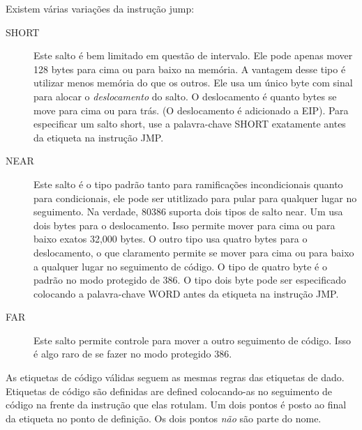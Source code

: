 Existem várias variações da instrução jump:
\begin{description}

\item[SHORT] Este salto é bem limitado em questão de intervalo. Ele pode apenas mover 128 bytes para cima
ou para baixo na memória. A vantagem desse tipo é utilizar menos
memória do que os outros. Ele usa um único byte com sinal para alocar o 
\emph{deslocamento} do salto. O deslocamento é quanto bytes se move para cima 
ou para trás. (O deslocamento é adicionado a EIP). Para especificar um salto
short, use a palavra-chave {\code SHORT} exatamente antes da etiqueta
na instrução {\code JMP}.

\item[NEAR] Este salto é o tipo padrão tanto para ramificações incondicionais quanto 
para condicionais, ele pode ser utitlizado para pular para qualquer lugar no
seguimento. Na verdade, 80386 suporta dois tipos de salto near. Um
usa dois bytes para o deslocamento. Isso permite mover para cima ou
para baixo exatos 32,000 bytes. O outro tipo usa quatro bytes para o
deslocamento, o que claramento permite se mover para cima ou para baixo a qualquer lugar no 
seguimento de código. O tipo de quatro byte é o padrão no modo protegido de 386. 
O tipo dois byte pode ser especificado colocando a palavra-chave {\code WORD}
antes da etiqueta na instrução {\code JMP}.

\item[FAR] Este salto permite controle para mover a outro seguimento de código. Isso é algo
raro de se fazer no modo protegido 386.
\end{description}

As etiquetas de código válidas seguem as mesmas regras das etiquetas de dado. Etiquetas de código
são definidas are defined colocando-as no seguimento de código na frente da instrução que
elas rotulam. Um dois pontos é posto ao final da etiqueta no ponto de definição. 
Os dois pontos \emph{não} são parte do nome.


